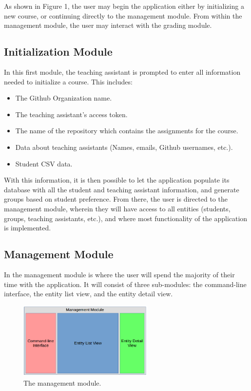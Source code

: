 \documentclass{article}
\begin{document}
	\noindent
	As shown in Figure 1, the user may begin the application either by initializing a new course, or continuing directly to the management module. From within the management module, the user may interact with the grading module.
	
	\subsection{Initialization Module}
		In this first module, the teaching assistant is prompted to enter all information needed to initialize a course. This includes:
		
		\begin{itemize}
			\item The Github Organization name.
			
			\item The teaching assistant's access token.
			
			\item The name of the repository which contains the assignments for the course.
			
			\item Data about teaching assistants (Names, emails, Github usernames, etc.).
			
			\item Student CSV data.
		\end{itemize}
		
		\noindent
		With this information, it is then possible to let the application populate its database with all the student and teaching assistant information, and generate groups based on student preference. From there, the user is directed to the management module, wherein they will have access to all entities (students, groups, teaching assistants, etc.), and where most functionality of the application is implemented.
		
	\subsection{Management Module}
		In the management module is where the user will spend the majority of their time with the application. It will consist of three sub-modules: the command-line interface, the entity list view, and the entity detail view.
	
		\begin{figure}[h]
			\centering
				\includegraphics[width=0.6\textwidth]{image/managementModule.png}
				\caption{The management module.}
		\end{figure}
		
\end{document}
